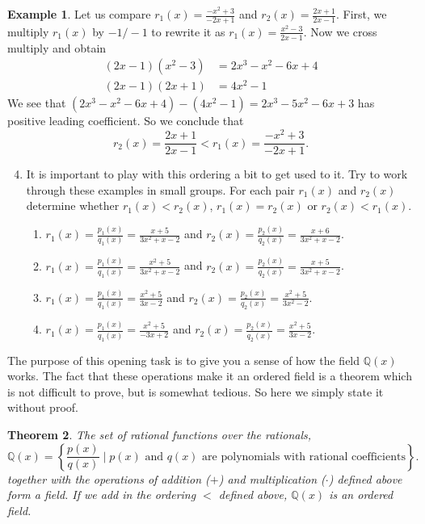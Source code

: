 \documentclass[11pt]{article}
\newenvironment{task}
	{\begin{mdframed}[linecolor=lightgray, linewidth=3pt]\raggedright}
	{\end{mdframed}}
\newtheorem{theorem}{Theorem}[section]
\theoremstyle{definition}
\newtheorem{example}[theorem]{Example}
\begin{document}
\begin{task}
\begin{example}
  Let us compare $r_1(x) = \frac{-x^2+3}{-2x+1}$ and $r_2(x) = \frac{2x+1}{2x-1}$. First, we multiply $r_1(x)$ by $-1/-1$ to rewrite it as
  $r_1(x) = \frac{x^2-3}{2x-1}$. Now we cross multiply and obtain
  \begin{align*}
    (2x-1)(x^2-3) &= 2x^3-x^2-6x +4\\
    (2x-1)(2x+1) &= 4x^2-1
  \end{align*}
  We see that $(2x^3-x^2-6x +4)- (4x^2-1) = 2x^3-5x^2-6x+3$ has positive leading coefficient. So we conclude that
  \[r_2(x) = \frac{2x+1}{2x-1} < r_1(x) = \frac{-x^2+3}{-2x+1}. \]
\end{example}

\begin{enumerate}
    \setcounter{enumi}{3}
  \item It is important to play with this ordering a bit to get used to it. Try to work through these examples in small groups. For each pair $r_1(x)$ and $r_2(x)$
    determine whether $r_1(x) < r_2(x)$, $r_1(x)=r_2(x)$ or $r_2(x) < r_1(x)$.
    \begin{enumerate}
      \item  $r_1(x) = \frac{p_1(x)}{q_1(x)} = \frac{x+5}{3x^2+x-2}$ and $r_2(x) = \frac{p_2(x)}{q_2(x)}=\frac{x+6}{3x^2+x-2}$.
      \item  $r_1(x) = \frac{p_1(x)}{q_1(x)} = \frac{x^2+5}{3x^2+x-2}$ and $r_2(x) = \frac{p_2(x)}{q_2(x)}=\frac{x+5}{3x^2+x-2}$.
      \item  $r_1(x) = \frac{p_1(x)}{q_1(x)} = \frac{x^2+5}{3x-2}$ and $r_2(x) = \frac{p_2(x)}{q_2(x)}=\frac{x^2+5}{3x^2-2}$.
      \item  $r_1(x) = \frac{p_1(x)}{q_1(x)} = \frac{x^2+5}{-3x+2}$ and $r_2(x) = \frac{p_2(x)}{q_2(x)}=\frac{x^2+5}{3x-2}$.
    \end{enumerate}
\end{enumerate}

The purpose of this opening task is to give you a sense of how the field $\mathbb{Q}(x)$ works. The fact that these operations make it an ordered field is
a theorem which is not difficult to prove, but is somewhat tedious. So here we simply state it without proof.

\begin{theorem}
  The set of rational functions over the rationals,
\[ \mathbb{Q}(x) = \left\{ \frac{p(x)}{q(x)} \mid p(x) \text{ and }q(x)\text{ are polynomials with rational coefficients} \right\}.\]
together with the operations of addition ($+$) and multiplication ($\cdot$) defined above form a field. If we add in the ordering $<$ defined above,
$\mathbb{Q}(x)$ is an ordered field.
  \label{theorem: rational fcns over rational form a field}
\end{theorem}


\end{task}
\end{document}
